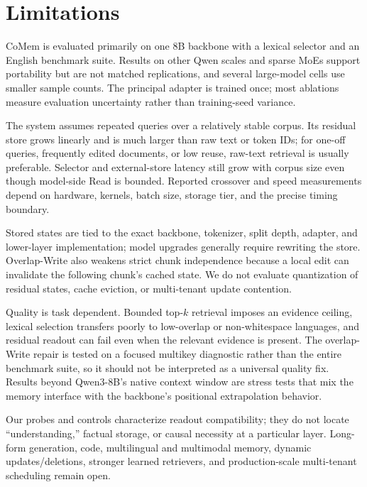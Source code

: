 \section*{Limitations}
\label{sec:limitations}

CoMem is evaluated primarily on one 8B backbone with a lexical selector and an
English benchmark suite. Results on other Qwen scales and sparse MoEs support
portability but are not matched replications, and several large-model cells use
smaller sample counts. The principal adapter is trained once; most ablations
measure evaluation uncertainty rather than training-seed variance.

The system assumes repeated queries over a relatively stable corpus. Its
residual store grows linearly and is much larger than raw text or token IDs;
for one-off queries, frequently edited documents, or low reuse, raw-text
retrieval is usually preferable. Selector and external-store latency still grow
with corpus size even though model-side Read is bounded. Reported crossover and
speed measurements depend on hardware, kernels, batch size, storage tier, and
the precise timing boundary.

Stored states are tied to the exact backbone, tokenizer, split depth, adapter,
and lower-layer implementation; model upgrades generally require rewriting the
store. Overlap-Write also weakens strict chunk independence because a local edit
can invalidate the following chunk's cached state. We do not evaluate
quantization of residual states, cache eviction, or multi-tenant update
contention.

Quality is task dependent. Bounded top-$k$ retrieval imposes an evidence ceiling,
lexical selection transfers poorly to low-overlap or non-whitespace languages,
and residual readout can fail even when the relevant evidence is present. The
overlap-Write repair is tested on a focused multikey diagnostic rather than the
entire benchmark suite, so it should not be interpreted as a universal quality
fix. Results beyond Qwen3-8B's native context window are stress tests that mix
the memory interface with the backbone's positional extrapolation behavior.

Our probes and controls characterize readout compatibility; they do not locate
``understanding,'' factual storage, or causal necessity at a particular layer.
Long-form generation, code, multilingual and multimodal memory, dynamic
updates/deletions, stronger learned retrievers, and production-scale
multi-tenant scheduling remain open.
